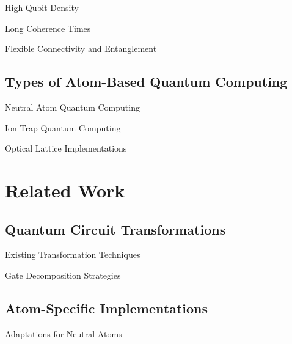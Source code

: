 \documentclass{beamer}
\begin{document}
\begin{frame}{High Qubit Density}
\end{frame}

\begin{frame}{Long Coherence Times}
\end{frame}

\begin{frame}{Flexible Connectivity and Entanglement}
\end{frame}

\subsection{Types of Atom-Based Quantum Computing}

\begin{frame}{Neutral Atom Quantum Computing}
\end{frame}

\begin{frame}{Ion Trap Quantum Computing}
\end{frame}

\begin{frame}{Optical Lattice Implementations}
\end{frame}

\section{Related Work}

\subsection{Quantum Circuit Transformations}

\begin{frame}{Existing Transformation Techniques}
\end{frame}

\begin{frame}{Gate Decomposition Strategies}
\end{frame}

\subsection{Atom-Specific Implementations}

\begin{frame}{Adaptations for Neutral Atoms}
\end{frame}
\end{document}
